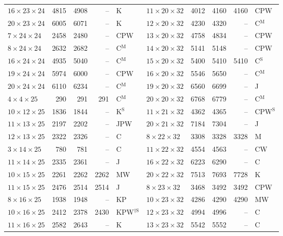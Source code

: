 \begin{longtable}{@{}lrrrl@{\hspace{6mm}}lrrrl@{}}
$16{\times}23{\times}24$ & 4815 & 4908 & -- & K & $11{\times}20{\times}32$ & 4012 & 4160 & 4160 & CPW\\
$20{\times}23{\times}24$ & 6005 & 6071 & -- & K & $12{\times}20{\times}32$ & 4230 & 4320 & -- & C$^{\mathrm{M}}$\\
$7{\times}24{\times}24$ & 2458 & 2480 & -- & CPW & $13{\times}20{\times}32$ & 4758 & 4834 & -- & CPW\\
$8{\times}24{\times}24$ & 2632 & 2682 & -- & C$^{\mathrm{M}}$ & $14{\times}20{\times}32$ & 5141 & 5148 & -- & CPW\\
$16{\times}24{\times}24$ & 4935 & 5040 & -- & C$^{\mathrm{M}}$ & $15{\times}20{\times}32$ & 5400 & 5410 & 5410 & C$^{\mathrm{S}}$\\
$19{\times}24{\times}24$ & 5974 & 6000 & -- & CPW & $16{\times}20{\times}32$ & 5546 & 5650 & -- & C$^{\mathrm{M}}$\\
$20{\times}24{\times}24$ & 6110 & 6234 & -- & C$^{\mathrm{M}}$ & $19{\times}20{\times}32$ & 6560 & 6699 & -- & J\\
$4{\times}4{\times}25$ & 290 & 291 & 291 & C$^{\mathrm{M}}$ & $20{\times}20{\times}32$ & 6768 & 6779 & -- & C$^{\mathrm{M}}$\\
$10{\times}12{\times}25$ & 1836 & 1844 & -- & K$^{\mathrm{S}}$ & $11{\times}21{\times}32$ & 4362 & 4365 & -- & CPW$^{\mathrm{S}}$\\
$11{\times}13{\times}25$ & 2197 & 2202 & -- & JPW & $20{\times}21{\times}32$ & 7184 & 7304 & -- & J\\
$12{\times}13{\times}25$ & 2322 & 2326 & -- & C & $8{\times}22{\times}32$ & 3308 & 3328 & 3328 & M\\
$3{\times}14{\times}25$ & 780 & 781 & -- & C & $11{\times}22{\times}32$ & 4554 & 4563 & -- & CW\\
$11{\times}14{\times}25$ & 2335 & 2361 & -- & J & $16{\times}22{\times}32$ & 6223 & 6290 & -- & C\\
$10{\times}15{\times}25$ & 2261 & 2262 & 2262 & MW & $20{\times}22{\times}32$ & 7513 & 7693 & 7728 & K\\
$11{\times}15{\times}25$ & 2476 & 2514 & 2514 & J & $8{\times}23{\times}32$ & 3468 & 3492 & 3492 & CPW\\
$8{\times}16{\times}25$ & 1938 & 1948 & -- & KP & $10{\times}23{\times}32$ & 4286 & 4290 & 4290 & MW\\
$10{\times}16{\times}25$ & 2412 & 2378 & 2430 & KPW$^{\dagger\mathrm{S}}$ & $12{\times}23{\times}32$ & 4994 & 4996 & -- & C\\
$11{\times}16{\times}25$ & 2582 & 2643 & -- & K & $13{\times}23{\times}32$ & 5542 & 5552 & -- & C\\

\end{longtable}
